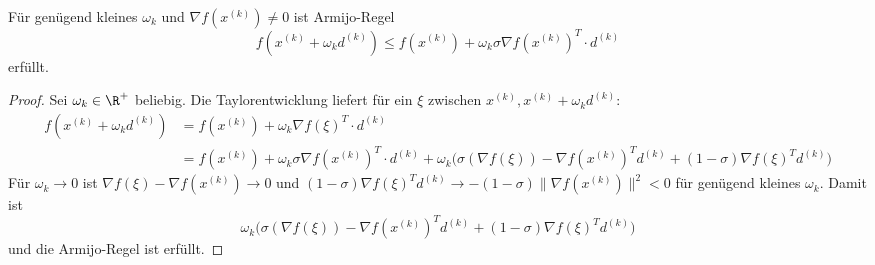 \documentclass[11pt]{scrartcl}
\begin{document}
\begin{lem} \label{4.7}
	Für genügend kleines $\omega_k$ und $\nabla f(x^{(k)}) \neq 0$ ist Armijo-Regel
	\[
		f(x^{(k)} + \omega_k d^{(k)}) \le f(x^{(k)}) + \omega_k \sigma \nabla f(x^{(k)})^T \cdot d^{(k)}
	\]
	erfüllt.
	\begin{proof}
		Sei $\omega_k \in \R^+$ beliebig.
		Die Taylorentwicklung liefert für ein $\xi$ zwischen $x^{(k)}, x^{(k)} + \omega_k d^{(k)}$:
		\begin{align*}
			f(x^{(k)}+ \omega_k d^{(k)}) &= f(x^{(k)}) + \omega_k \nabla f(\xi)^T \cdot d^{(k)} \\
			&= f(x^{(k)}) + \omega_k \sigma \nabla f(x^{(k)})^T \cdot d^{(k)}
			+ \omega_k \big(\sigma (\nabla f(\xi)) - \nabla f(x^{(k)})^T d^{(k)} + (1-\sigma)\nabla f(\xi)^T d^{(k)} \Big)
		\end{align*}
		Für $\omega_k \to 0$ ist $\nabla f(\xi) - \nabla f(x^{(k)}) \to 0$ und $(1-\sigma) \nabla f(\xi)^T d^{(k)} \to -(1-\sigma)\|\nabla f(x^{(k)})\|^2 < 0$ für genügend kleines $\omega_k$.
		Damit ist
		\[
			\omega_k \big(\sigma (\nabla f(\xi)) - \nabla f(x^{(k)})^T d^{(k)} + (1-\sigma)\nabla f(\xi)^T d^{(k)} \Big)
		\]
		und die Armijo-Regel ist erfüllt.
	\end{proof}
\end{lem}
\end{document}
